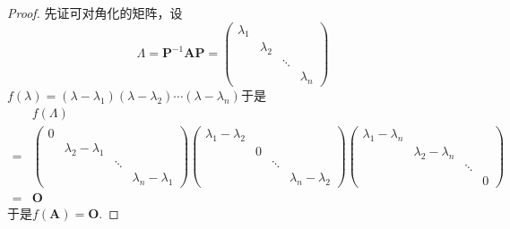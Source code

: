 \begin{proof}
    先证可对角化的矩阵，设
    \[
        \bm{\varLambda}=
        \bm{P}^{-1}\bm{AP}=\begin{pmatrix}
            \lambda_1 &           &        &           \\
                      & \lambda_2 &        &           \\
                      &           & \ddots &           \\
                      &           &        & \lambda_n
        \end{pmatrix}
    \]$f\left(\lambda\right)=
        \left(
        \lambda-\lambda_1
        \right)\left(
        \lambda-\lambda_2
        \right)\cdots\left(
        \lambda-\lambda_n
        \right)$于是
    \begin{align*}
          & f\left(\bm{\varLambda}\right)                      \\
        = &
        \begin{pmatrix}
            0 &                     &        &                     \\
              & \lambda_2-\lambda_1 &        &                     \\
              &                     & \ddots &                     \\
              &                     &        & \lambda_n-\lambda_1
        \end{pmatrix}\begin{pmatrix}
                         \lambda_1-\lambda_2 &   &        &                     \\
                                             & 0 &        &                     \\
                                             &   & \ddots &                     \\
                                             &   &        & \lambda_n-\lambda_2
                     \end{pmatrix}
        \begin{pmatrix}
            \lambda_1-\lambda_n &                     &        &   \\
                                & \lambda_2-\lambda_n &        &   \\
                                &                     & \ddots &   \\
                                &                     &        & 0
        \end{pmatrix} \\
        = & \bm{O}
    \end{align*}于是$f\left(\bm{A}\right)=\bm{O}.$


\end{proof}
